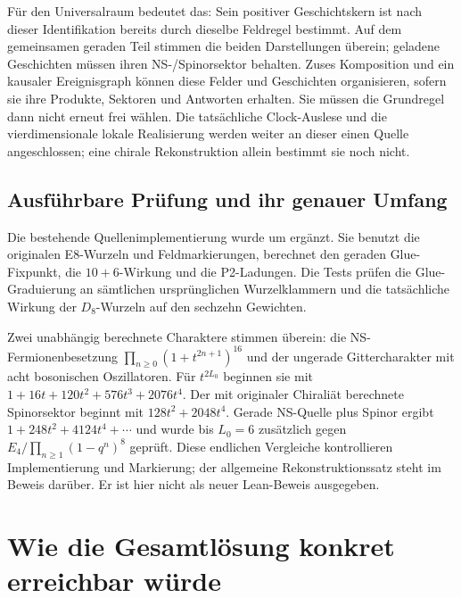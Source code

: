 Für den Universalraum bedeutet das: Sein positiver Geschichtskern ist nach dieser Identifikation bereits durch dieselbe Feldregel bestimmt. Auf dem gemeinsamen geraden Teil stimmen die beiden Darstellungen überein; geladene Geschichten müssen ihren NS-/Spinorsektor behalten. Zuses Komposition und ein kausaler Ereignisgraph können diese Felder und Geschichten organisieren, sofern sie ihre Produkte, Sektoren und Antworten erhalten. Sie müssen die Grundregel dann nicht erneut frei wählen. Die tatsächliche Clock-Auslese und die vierdimensionale lokale Realisierung werden weiter an dieser einen Quelle angeschlossen; eine chirale Rekonstruktion allein bestimmt sie noch nicht.


\subsection{Ausführbare Prüfung und ihr genauer Umfang}
Die bestehende Quellenimplementierung wurde um  ergänzt. Sie benutzt die originalen E8-Wurzeln und Feldmarkierungen, berechnet den geraden Glue-Fixpunkt, die $10+6$-Wirkung und die P2-Ladungen. Die Tests prüfen die Glue-Graduierung an sämtlichen ursprünglichen Wurzelklammern und die tatsächliche Wirkung der $D_8$-Wurzeln auf den sechzehn Gewichten.

Zwei unabhängig berechnete Charaktere stimmen überein: die NS-Fermionenbesetzung $\prod_{n\ge0}(1+t^{2n+1})^{16}$ und der ungerade Gittercharakter mit acht bosonischen Oszillatoren. Für $t^{2L_0}$ beginnen sie mit $1+16t+120t^2+576t^3+2076t^4$. Der mit originaler Chiraliät berechnete Spinorsektor beginnt mit $128t^2+2048t^4$. Gerade NS-Quelle plus Spinor ergibt $1+248t^2+4124t^4+\cdots$ und wurde bis $L_0=6$ zusätzlich gegen $E_4/\prod_{n\ge1}(1-q^n)^8$ geprüft. Diese endlichen Vergleiche kontrollieren Implementierung und Markierung; der allgemeine Rekonstruktionssatz steht im Beweis darüber. Er ist hier nicht als neuer Lean-Beweis ausgegeben.

\section{Wie die Gesamtlösung konkret erreichbar würde}\label{sec:completion}

